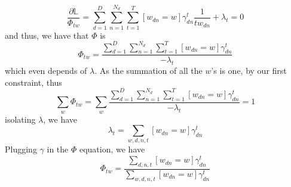 \documentclass{article}
\begin{document}
\begin{equation}
    \frac{\partial\mathbb{L}}{\Phi_{tw}} = \sum_{d=1}^D \sum_{n=1}^{N_d} \sum_{t=1}^T [w_{dn}=w]\gamma_{dn}^t \frac{1}{tw_{dn}} + \lambda_t = 0
\end{equation}
and thus, we have that $\Phi$ is
\begin{equation}
    \Phi_{tw} = \frac{\sum_{d=1}^D \sum_{n=1}^{N_d} \sum_{t=1}^T [w_{dn}=w]\gamma_{dn}^t}{-\lambda_t}
\end{equation}
which even depends of $\lambda$. As the summation of all the $w$'s is one, by our first constraint, thus
\begin{equation}
    \sum_{w}\Phi_{tw} = \sum_{w} \frac{\sum_{d=1}^D \sum_{n=1}^{N_d} \sum_{t=1}^T [w_{dn}=w]\gamma_{dn}^t}{-\lambda_t} = 1
\end{equation}
isolating $\lambda$, we have
\begin{equation}
    \lambda_t = \sum_{w, d, n, t} [w_{dn}=w] \gamma_{dn}^t
\end{equation}
Plugging $\gamma$ in the $\Phi$ equation, we have
\begin{equation}
    \Phi_{tw} = \frac{\sum_{d, n, t} [w_{dn}=w] \gamma_{dn}^t}{\sum_{w, d, n, t} [w_{dn}=w] \gamma_{dn}^t}
\end{equation}
\end{document}

